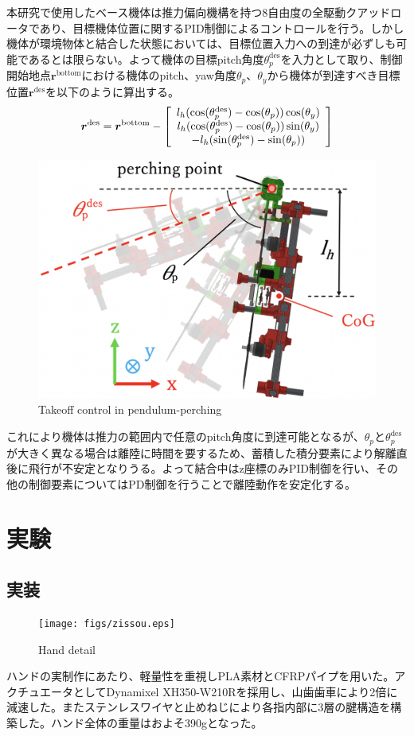 \documentclass{jarticle}
\begin{document}
本研究で使用したベース機体は推力偏向機構を持つ8自由度の全駆動クアッドロータであり、目標機体位置に関するPID制御によるコントロールを行う。しかし機体が環境物体と結合した状態においては、目標位置入力への到達が必ずしも可能であるとは限らない。よって機体の目標pitch角度$\theta_p^\text{des}$を入力として取り、制御開始地点$\bm{r}^\text{bottom}$における機体のpitch、yaw角度$\theta_p、\theta_y$から機体が到達すべき目標位置$\bm{r}^\text{des}$を以下のように算出する。
\vspace{-2mm}
\begin{equation}
  \bm{r}^\text{des} = \bm{r}^\text{bottom} -
  \left[ \begin{array}{c} l_h(\cos(\theta_p^\text{des}) - \cos(\theta_p))\cos(\theta_y) \\
      l_h(\cos(\theta_p^\text{des}) - \cos(\theta_p))\sin(\theta_y) \\
      -l_h(\sin(\theta_p^\text{des}) - \sin(\theta_p))
    \end{array} \right]
  \vspace{-2mm}
  \label{eq:rset}
\end{equation}
\begin{figure}[tb]
  \centering
  \includegraphics[width=0.6\columnwidth]{figs/rset.eps}
  \caption{Takeoff control in pendulum-perching}
  \vspace{-4mm}
  \label{fig:rset}
\end{figure}
これにより機体は推力の範囲内で任意のpitch角度に到達可能となるが、$\theta_p$と$\theta_p^\text{des}$が大きく異なる場合は離陸に時間を要するため、蓄積した積分要素により解離直後に飛行が不安定となりうる。よって結合中はz座標のみPID制御を行い、その他の制御要素についてはPD制御を行うことで離陸動作を安定化する。

\section{実験}
\subsection{実装}
\vspace{-2mm}
\begin{figure}[h]
  \centering
  \texttt{[image: figs/zissou.eps]}
  \caption{Hand detail}
  \vspace{-2mm}
  \label{fig:zissou}
\end{figure}
ハンドの実制作にあたり、軽量性を重視しPLA素材とCFRPパイプを用いた。アクチュエータとしてDynamixel XH350-W210Rを採用し、山歯歯車により2倍に減速した。またステンレスワイヤと止めねじにより各指内部に3層の腱構造を構築した。ハンド全体の重量はおよそ390gとなった。
\end{document}
